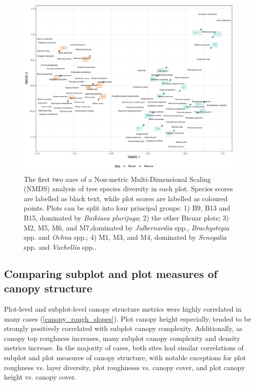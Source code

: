 \documentclass[11pt,a4paper]{article}
\begin{document}
\begin{figure}[H]
\centering
	\includegraphics[width=\textwidth]{nmds}
	\caption{The first two axes of a Non-metric Multi-Dimensional Scaling (NMDS) analysis of tree species diversity in each plot. Species scores are labelled as black text, while plot scores are labelled as coloured points. Plots can be split into four principal groups: 1) B9, B13 and B15, dominated by \textit{Baikiaea plurijuga}; 2) the other Bicuar plots; 3) M2, M5, M6, and M7,dominated by \textit{Julbernardia} spp., \textit{Brachystegia} spp. and \textit{Ochna} spp.; 4) M1, M3, and M4, dominated by \textit{Senegalia} spp. and \textit{Vachellia} spp..}
	\label{nmds}
\end{figure}


\subsection{Comparing subplot and plot measures of canopy structure}

Plot-level and subplot-level canopy structure metrics were highly correlated in many cases (\autoref{canopy_rough_slopes}). Plot canopy height especially, tended to be strongly positively correlated with subplot canopy complexity. Additionally, as canopy top roughness increases, many subplot canopy complexity and density metrics increase. In the majority of cases, both sites had similar correlations of subplot and plot measures of canopy structure, with notable exceptions for plot roughness vs. layer diversity, plot roughnesss vs. canopy cover, and plot canopy height vs. canopy cover.
\end{document}
